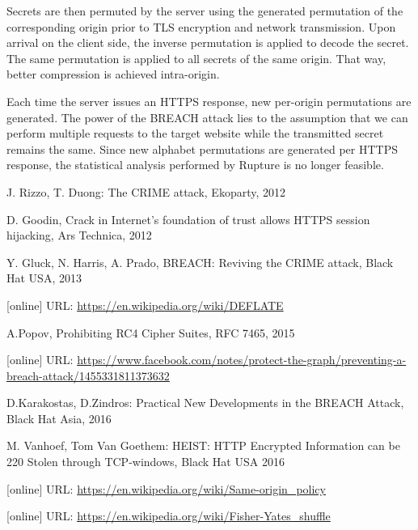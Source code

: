 \documentclass[a4paper, 11 pt, conference]{article}  %
\begin{document}
Secrets are then permuted by the server using the generated permutation of the
corresponding origin prior to TLS encryption and network transmission. Upon
arrival on the client side, the inverse permutation is applied to decode the
secret. The same permutation is applied to all secrets of the same origin. That
way, better compression is achieved intra-origin.

Each time the server issues an HTTPS response, new per-origin permutations are
generated. The power of the BREACH attack lies to the assumption that we can perform
multiple requests to the target website while the transmitted secret remains the same. Since new alphabet permutations are generated per HTTPS response, the statistical analysis performed by Rupture is no longer feasible.

\begin{thebibliography}{10}

 J. Rizzo, T. Duong: The CRIME attack, Ekoparty, 2012

 D. Goodin, Crack in Internet’s foundation of trust allows HTTPS session hijacking, Ars Technica, 2012

 Y. Gluck, N. Harris, A. Prado, BREACH: Reviving the CRIME attack, Black Hat USA, 2013

 [online] URL: \url{https://en.wikipedia.org/wiki/DEFLATE} 

 A.Popov, Prohibiting RC4 Cipher Suites, RFC 7465, 2015

 [online] URL: \url{https://www.facebook.com/notes/protect-the-graph/preventing-a-breach-attack/1455331811373632}

  D.Karakostas, D.Zindros: Practical New Developments in the BREACH Attack, Black Hat Asia, 2016

 M. Vanhoef, Tom Van Goethem: HEIST: HTTP Encrypted Information can be 220 Stolen through TCP-windows, Black Hat USA 2016

[online] URL: \url{https://en.wikipedia.org/wiki/Same-origin_policy} 

 [online] URL: \url{https://en.wikipedia.org/wiki/Fisher-Yates_shuffle}

\end{thebibliography}
\end{document}
